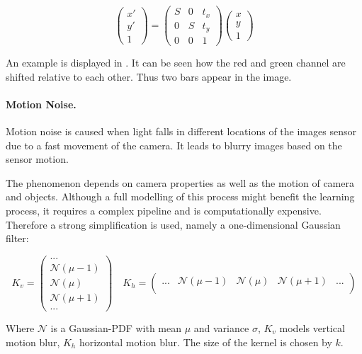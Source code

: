 \begin{equation}
\begin{pmatrix}
x' \\
y' \\
1
\end{pmatrix} = \begin{pmatrix}
S & 0 & t_x \\
0 & S & t_y \\
0 & 0 & 1
\end{pmatrix} \begin{pmatrix}
x \\
y \\
1
\end{pmatrix}
\end{equation}

An example is displayed in . It can be seen how the red and green channel are shifted relative to each other. Thus two bars appear in the image.

\paragraph{Motion Noise.}

Motion noise is caused when light falls in different locations of the images sensor due to a fast movement of the camera. It leads to blurry images based on the sensor motion.

The phenomenon depends on camera properties as well as the motion of camera and objects. Although a full modelling of this process might benefit the learning process, it requires a complex pipeline and is computationally expensive. Therefore a strong simplification is used, namely a one-dimensional Gaussian filter:

\begin{equation}
K_v = \begin{pmatrix}
...				 \\
\mathcal{N}(\mu-1) \\
\mathcal{N}(\mu)  \\
\mathcal{N}(\mu+1)	 \\
	...					
\end{pmatrix} \quad
K_h = \begin{pmatrix}
...	& \mathcal{N}(\mu-1)	&	\mathcal{N}(\mu) &	\mathcal{N}(\mu+1) & ...\\
\end{pmatrix}
	\label{eq:motion_noise}
\end{equation}

Where $\mathcal{N}$ is a Gaussian-PDF with mean $\mu$ and variance $\sigma$,  $K_v$ models vertical motion blur, $K_h$ horizontal motion blur. The size of the kernel is chosen by $k$.

